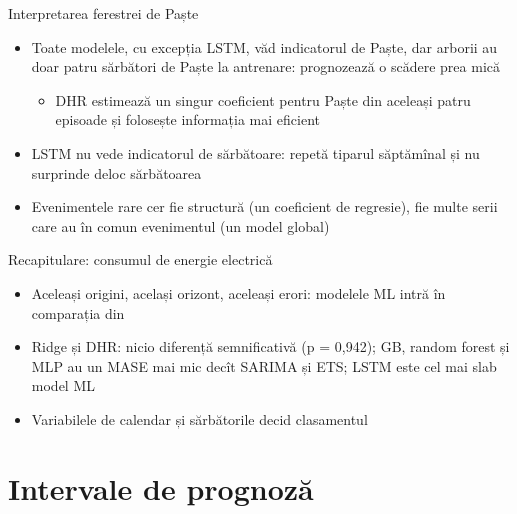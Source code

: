\begin{frame}{Interpretarea ferestrei de Paște}
\itemsize{\small}
\begin{itemize}
    \item Toate modelele, cu excepția LSTM, văd indicatorul de Paște, dar arborii au doar patru sărbători de Paște la antrenare: prognozează o scădere prea mică
    \begin{itemize}
        \item DHR estimează un singur coeficient pentru Paște din aceleași patru episoade și folosește informația mai eficient
    \end{itemize}
    \item LSTM nu vede indicatorul de sărbătoare: repetă tiparul săptămînal și nu surprinde deloc sărbătoarea
    \item Evenimentele rare cer fie structură (un coeficient de regresie), fie multe serii care au în comun evenimentul (un model global)
\end{itemize}
\end{frame}

\begin{frame}{Recapitulare: consumul de energie electrică}
\itemsize{\small}
\begin{itemize}
    \item Aceleași origini, același orizont, aceleași erori: modelele ML intră în comparația din 
    \item Ridge și DHR: nicio diferență semnificativă (p = 0{,}942); GB, random forest și MLP au un MASE mai mic decît SARIMA și ETS; LSTM este cel mai slab model ML
    \item Variabilele de calendar și sărbătorile decid clasamentul
\end{itemize}
\end{frame}


\section{Intervale de prognoză}


